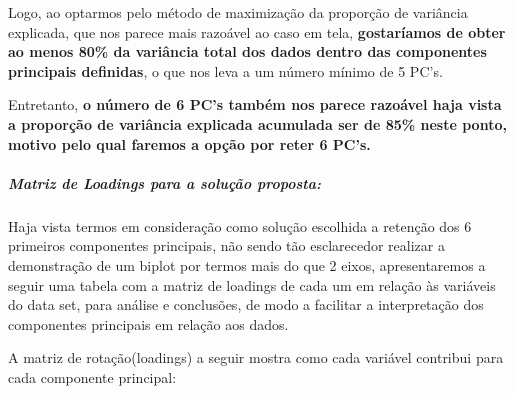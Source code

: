 \documentclass[
  letterpaper,
  DIV=11,
  numbers=noendperiod]{scrartcl}
\let\oldsubparagraph\subparagraph
\renewcommand{\subparagraph}[1]{\oldsubparagraph{#1}\mbox{}}
\begin{document}
Logo, ao optarmos pelo método de maximização da proporção de variância
explicada, que nos parece mais razoável ao caso em tela,
\textbf{gostaríamos de obter ao menos 80\% da variância total dos dados
dentro das componentes principais definidas}, o que nos leva a um número
mínimo de 5 PC's.

Entretanto, \textbf{o número de 6 PC's também nos parece razoável haja
vista a proporção de variância explicada acumulada ser de 85\% neste
ponto, motivo pelo qual faremos a opção por reter 6 PC's.}

\subparagraph{Matriz de Loadings para a solução
proposta:}\label{matriz-de-loadings-para-a-soluuxe7uxe3o-proposta}

Haja vista termos em consideração como solução escolhida a retenção dos
6 primeiros componentes principais, não sendo tão esclarecedor realizar
a demonstração de um biplot por termos mais do que 2 eixos,
apresentaremos a seguir uma tabela com a matriz de loadings de cada um
em relação às variáveis do data set, para análise e conclusões, de modo
a facilitar a interpretação dos componentes principais em relação aos
dados.

A matriz de rotação(loadings) a seguir mostra como cada variável
contribui para cada componente principal:
\end{document}
